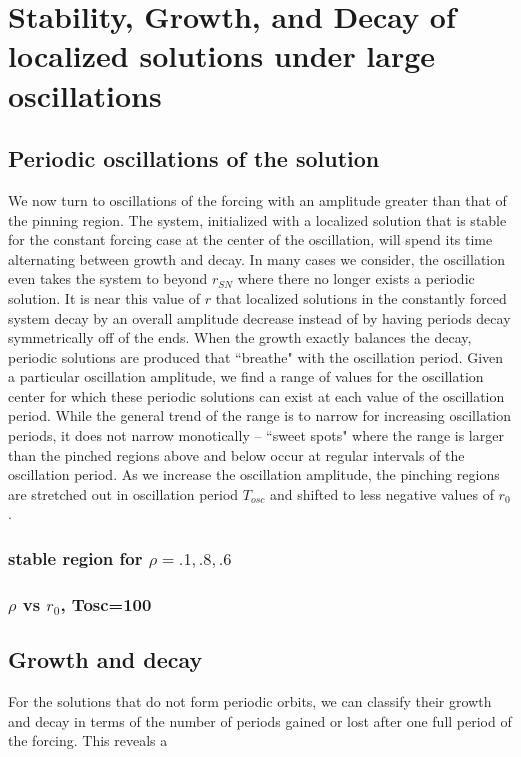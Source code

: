 \documentclass[../main/TimeForcingSHE.tex]{subfiles}
\begin{document}
\section{Stability, Growth, and Decay of localized solutions under large oscillations }
\subsection{Periodic oscillations of the solution}

We now turn to oscillations of the forcing with an amplitude greater than that of the pinning region.   The system,  initialized with a localized solution that is stable for the constant forcing case at the center of the oscillation, will spend its time alternating between growth and decay.  In many cases we consider, the oscillation even takes the system to beyond $r_{SN}$ where there no longer exists a periodic solution.  It is near this value of $r$ that localized solutions in the constantly forced system decay by an overall amplitude decrease instead of by having periods decay symmetrically off of the ends.     When the growth exactly balances the decay, periodic solutions are produced that ``breathe" with the oscillation period. Given a particular oscillation amplitude, we find a range of values for the oscillation center for which these periodic solutions can exist at each value of the oscillation period.  While the general trend of the range is to narrow for increasing oscillation periods, it does not narrow monotically -- ``sweet spots" where the range is larger than the pinched regions above and below occur at regular intervals of the oscillation period.  As we increase the oscillation amplitude, the  pinching regions are stretched out in oscillation period $T_{osc}$ and shifted to less negative values of $r_0$.  




\FIGvcmcompare



	\subsubsection{stable region for $\rho=.1,.8,.6$}
	\subsubsection{$\rho$ vs $r_0$, Tosc=100}

\subsection{Growth and decay}
For the solutions that do not form periodic orbits, we can classify their growth and decay in terms of the number of periods gained or lost after one full period of the forcing.  This reveals a 
\end{document}
